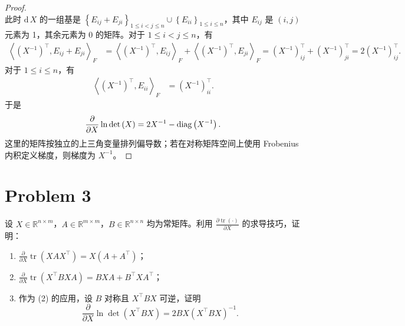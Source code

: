 \begin{proof}
\[    \]
    此时 $\mathrm{d}\, X$ 的一组基是 $\left\{E_{ij} + E_{ji}\right\}_{1 \leq i < j \leq n} \cup \left\{E_{ii}\right\}_{1 \leq i \leq n}$，其中 $E_{ij}$ 是 $(i, j)$ 元素为 1，其余元素为 0 的矩阵。对于 $1 \leq i < j \leq n$，有
    \[
        \begin{aligned}
            \left\langle \left(X^{-1}\right)^\top, E_{ij} + E_{ji} \right\rangle_F &= \left\langle \left(X^{-1}\right)^\top, E_{ij} \right\rangle_F + \left\langle \left(X^{-1}\right)^\top, E_{ji} \right\rangle_F = \left(X^{-1}\right)^\top_{ij} + \left(X^{-1}\right)^\top_{ji} = 2\left(X^{-1}\right)^\top_{ij}.
        \end{aligned}
    \]
    对于 $1 \leq i \leq n$，有
    \[
        \begin{aligned}
            \left\langle \left(X^{-1}\right)^\top, E_{ii} \right\rangle_F &= \left(X^{-1}\right)^\top_{ii}.
        \end{aligned}
    \]
    于是
    \[
        \frac{\partial}{\partial X} \ln \det \left(X\right) = 2X^{-1} - \mathrm{diag} \left(X^{-1}\right).
    \]
    这里的矩阵按独立的上三角变量排列偏导数；若在对称矩阵空间上使用 Frobenius 内积定义梯度，则梯度为 $X^{-1}$。
\end{proof}

\section*{Problem 3}

设 $X \in \mathbb{R}^{n \times m}$，$A \in \mathbb{R}^{m \times m}$，$B \in \mathbb{R}^{n \times n}$ 均为常矩阵。利用 $\displaystyle \frac{\partial \operatorname{tr}(\cdot)}{\partial X}$ 的求导技巧，证明：

\begin{enumerate}
    \item $\displaystyle \frac{\partial}{\partial X} \operatorname{tr}\left(XAX^\top\right) = X(A + A^\top)$；
    \item $\displaystyle \frac{\partial}{\partial X} \operatorname{tr}\left(X^\top BXA\right) = BXA + B^\top XA^\top$；
    \item 作为 (2) 的应用，设 $B$ 对称且 $X^\top BX$ 可逆，证明
    \[
        \frac{\partial}{\partial X} \ln \det\left(X^\top BX\right)
        =
        2BX\left(X^\top BX\right)^{-1}.
    \]
\end{enumerate}

